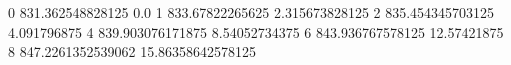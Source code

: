 0 831.362548828125 0.0
1 833.67822265625 2.315673828125
2 835.454345703125 4.091796875
4 839.903076171875 8.54052734375
6 843.936767578125 12.57421875
8 847.2261352539062 15.86358642578125
